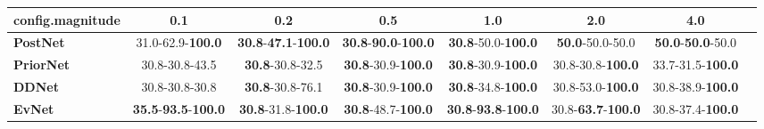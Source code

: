 \begin{tabular}{lccccccc}
\toprule
\textbf{config.magnitude} &                                         0.1 &                                         0.2 &                                         0.5 &                                         1.0 &                                2.0 &                               4.0 \\
\midrule
\textbf{PostNet } &                    31.0-62.9-\textbf{100.0} &  \textbf{30.8}-\textbf{47.1}-\textbf{100.0} &  \textbf{30.8}-\textbf{90.0}-\textbf{100.0} &           \textbf{30.8}-50.0-\textbf{100.0} &            \textbf{50.0}-50.0-50.0 &  \textbf{50.0}-\textbf{50.0}-50.0 \\
\textbf{PriorNet} &                              30.8-30.8-43.5 &                     \textbf{30.8}-30.8-32.5 &           \textbf{30.8}-30.9-\textbf{100.0} &           \textbf{30.8}-30.9-\textbf{100.0} &           30.8-30.8-\textbf{100.0} &          33.7-31.5-\textbf{100.0} \\
\textbf{DDNet   } &                              30.8-30.8-30.8 &                     \textbf{30.8}-30.8-76.1 &           \textbf{30.8}-30.9-\textbf{100.0} &           \textbf{30.8}-34.8-\textbf{100.0} &           30.8-53.0-\textbf{100.0} &          30.8-38.9-\textbf{100.0} \\
\textbf{EvNet   } &  \textbf{35.5}-\textbf{93.5}-\textbf{100.0} &           \textbf{30.8}-31.8-\textbf{100.0} &           \textbf{30.8}-48.7-\textbf{100.0} &  \textbf{30.8}-\textbf{93.8}-\textbf{100.0} &  30.8-\textbf{63.7}-\textbf{100.0} &          30.8-37.4-\textbf{100.0} \\
\bottomrule
\end{tabular}
